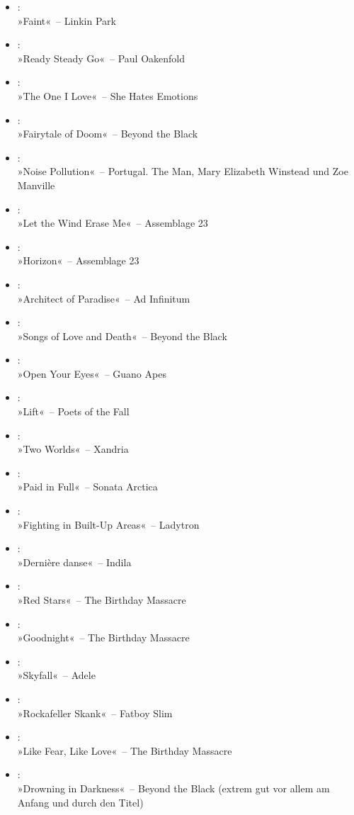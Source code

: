 \begin{itemize}
    \item :\\ »Faint«~– Linkin Park
    \item :\\ »Ready Steady Go«~– Paul Oakenfold
    \item :\\ »The One I Love«~– She Hates Emotions
    \item :\\ »Fairytale of Doom«~– Beyond the Black
    \item :\\ »Noise Pollution«~– Portugal. The Man, Mary Elizabeth Winstead und Zoe Manville
    \item :\\ »Let the Wind Erase Me«~– Assemblage 23
    \item :\\ »Horizon«~– Assemblage 23
    \item :\\ »Architect of Paradise«~– Ad Infinitum
    \item :\\ »Songs of Love and Death«~– Beyond the Black
    \item :\\ »Open Your Eyes«~– Guano Apes
    \item :\\ »Lift«~– Poets of the Fall
    \item :\\ »Two Worlds«~– Xandria
    \item :\\ »Paid in Full«~– Sonata Arctica
    \item :\\ »Fighting in Built-Up Areas«~– Ladytron
    \item :\\ »Dernière danse«~– Indila
    \item :\\ »Red Stars«~– The Birthday Massacre
    \item :\\ »Goodnight«~– The Birthday Massacre
    \item :\\ »Skyfall«~– Adele
    \item :\\ »Rockafeller Skank«~– Fatboy Slim
    \item :\\ »Like Fear, Like Love«~– The Birthday Massacre
    \item :\\ »Drowning in Darkness«~– Beyond the Black (extrem gut vor allem am Anfang und durch den Titel)

\end{itemize}

